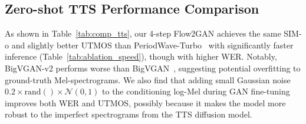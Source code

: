 \documentclass{article} %
\begin{document}
\begin{table}[h!]
\centering
\caption{Model generation speed comparison with batch size of 16 and length of 1 second. BigVGAN-v2$^*$ use the specialized CUDA kernel. }
\vspace{-0.5em}
\label{tab:ablation_speed}
\setlength{\tabcolsep}{6pt} %
\vspace{-0.5em}
\end{table}


\subsection{Zero-shot TTS Performance Comparison}
\label{ssec:comp_tts}


As shown in Table~\ref{tab:comp_tts}, our 4-step Flow2GAN achieves the same SIM-o and slightly better UTMOS than PeriodWave-Turbo~\citep{periodwave_turbo} with significantly faster inference (Table~\ref{tab:ablation_speed}), though with higher WER.
Notably, BigVGAN-v2 performs worse than BigVGAN~\citep{bigvgan}, suggesting potential overfitting to ground-truth Mel-spectrograms. We also find that adding small Gaussian noise $0.2 \times \text{rand}() \times \mathcal{N}(0, 1)$ to the conditioning log-Mel during GAN fine-tuning improves both WER and UTMOS, possibly because it makes the model more robust to the imperfect spectrograms from the TTS diffusion model.
\end{document}
